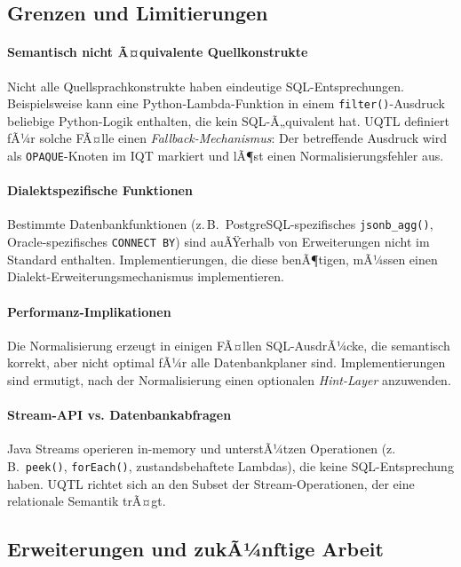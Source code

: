 \subsection{Grenzen und Limitierungen}
\label{subsec:grenzen}

\paragraph{Semantisch nicht Ã¤quivalente Quellkonstrukte}
Nicht alle Quellsprachkonstrukte haben eindeutige SQL-Entsprechungen.
Beispielsweise kann eine Python-Lambda-Funktion in einem \texttt{filter()}-Ausdruck
beliebige Python-Logik enthalten, die kein SQL-Ã„quivalent hat. UQTL definiert
fÃ¼r solche FÃ¤lle einen \emph{Fallback-Mechanismus}: Der betreffende Ausdruck
wird als \texttt{OPAQUE}-Knoten im IQT markiert und lÃ¶st einen Normalisierungsfehler
aus.

\paragraph{Dialektspezifische Funktionen}
Bestimmte Datenbankfunktionen (z.\,B.\ PostgreSQL-spezifisches \texttt{jsonb\_agg()},
Oracle-spezifisches \texttt{CONNECT BY}) sind auÃŸerhalb von Erweiterungen nicht
im Standard enthalten. Implementierungen, die diese benÃ¶tigen, mÃ¼ssen einen
Dialekt-Erweiterungsmechanismus implementieren.

\paragraph{Performanz-Implikationen}
Die Normalisierung erzeugt in einigen FÃ¤llen SQL-AusdrÃ¼cke, die semantisch
korrekt, aber nicht optimal fÃ¼r alle Datenbankplaner sind. Implementierungen
sind ermutigt, nach der Normalisierung einen optionalen \emph{Hint-Layer}
anzuwenden.

\paragraph{Stream-API vs. Datenbankabfragen}
Java Streams operieren in-memory und unterstÃ¼tzen Operationen (z.\,B.\
\texttt{peek()}, \texttt{forEach()}, zustandsbehaftete Lambdas), die keine
SQL-Entsprechung haben. UQTL richtet sich an den Subset der Stream-Operationen,
der eine relationale Semantik trÃ¤gt.

\subsection{Erweiterungen und zukÃ¼nftige Arbeit}
\label{subsec:erweiterungen}

